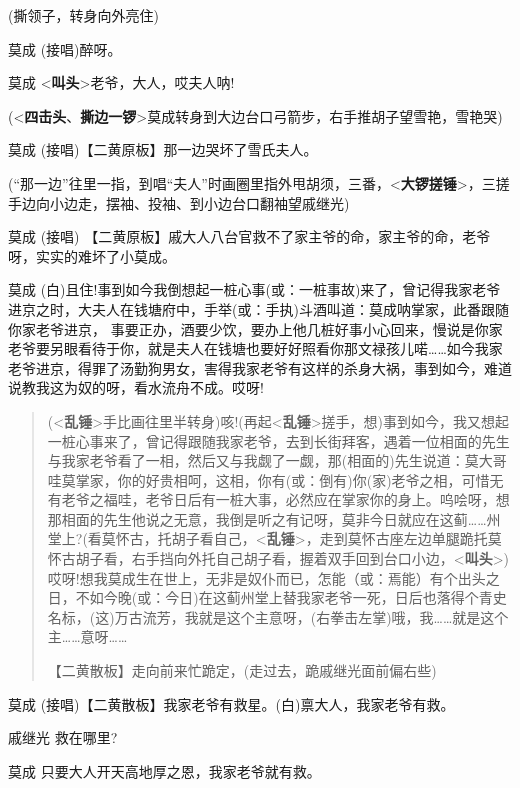 (撕领子，转身向外亮住)

莫成 (接唱)醉呀。

莫成 \textless{}\textbf{叫头}\textgreater{}老爷，大人，哎夫人呐!

(\textless{}\textbf{四击头}、\textbf{撕边一锣}\textgreater{}莫成转身到大边台口弓箭步，右手推胡子望雪艳，雪艳哭)

莫成 (接唱)【二黄原板】那一边哭坏了雪氏夫人。

(``那一边''往里一指，到唱``夫人''时画圈里指外甩胡须，三番，\textless{}\textbf{大锣搓锤}\textgreater{}，三搓手边向小边走，摆袖、投袖、到小边台口翻袖望戚继光)

莫成 (接唱)
【二黄原板】戚大人八台官救不了家主爷的命，家主爷的命，老爷呀，实实的难坏了小莫成。

莫成
(白)且住!事到如今我倒想起一桩心事(或：一桩事故)来了，曾记得我家老爷进京之时，大夫人在钱塘府中，手举(或：手执)斗酒叫道：莫成呐掌家，此番跟随你家老爷进京，
事要正办，酒要少饮，要办上他几桩好事小心回来，慢说是你家老爷要另眼看待于你，就是夫人在钱塘也要好好照看你那文禄孩儿喏\ldots{}\ldots{}如今我家老爷进京，得罪了汤勤狗男女，害得我家老爷有这样的杀身大祸，事到如今，难道说教我这为奴的呀，看水流舟不成。哎呀!

\begin{quote}
(\textless{}\textbf{乱锤}\textgreater{}手比画往里半转身)咳!(再起\textless{}\textbf{乱锤}\textgreater{}搓手，想)事到如今，我又想起一桩心事来了，曾记得跟随我家老爷，去到长街拜客，遇着一位相面的先生与我家老爷看了一相，然后又与我觑了一觑，那(相面的)先生说道：莫大哥哇莫掌家，你的好贵相呵，这相，你有(或：倒有)你(家)老爷之相，可惜无有老爷之福哇，老爷日后有一桩大事，必然应在掌家你的身上。呜哙呀，想那相面的先生他说之无意，我倒是听之有记呀，莫非今日就应在这蓟\ldots{}\ldots{}州堂上?(看莫怀古，托胡子看自己，\textless{}\textbf{乱锤}\textgreater{}，走到莫怀古座左边单腿跪托莫怀古胡子看，右手挡向外托自己胡子看，握着双手回到台口小边，\textless{}\textbf{叫头}\textgreater{})哎呀!想我莫成生在世上，无非是奴仆而已，怎能（或：焉能）有个出头之日，不如今晚(或：今日)在这蓟州堂上替我家老爷一死，日后也落得个青史名标，(这)万古流芳，我就是这个主意呀，(右拳击左掌)哦，我\ldots{}\ldots{}就是这个主\ldots{}\ldots{}意呀\ldots{}\ldots{}

【二黄散板】走向前来忙跪定，(走过去，跪戚继光面前偏右些)
\end{quote}

莫成 (接唱)【二黄散板】我家老爷有救星。(白)禀大人，我家老爷有救。

戚继光 救在哪里?

莫成 只要大人开天高地厚之恩，我家老爷就有救。

